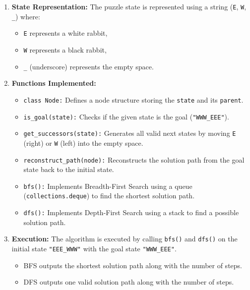 \documentclass[conference]{IEEEtran}
\begin{document}
\begin{enumerate}[label=\alph*)]
  \item \textbf{State Representation:}  
  The puzzle state is represented using a string (\texttt{E}, \texttt{W}, \texttt{\_}) where:  
  \begin{itemize}
    \item \texttt{E} represents a white rabbit,
    \item \texttt{W} represents a black rabbit,
    \item \texttt{\_} (underscore) represents the empty space.
  \end{itemize}

  \vspace{\baselineskip} %

  \item \textbf{Functions Implemented:}
  \begin{itemize}[itemsep=1ex, parsep=0pt]
    \item \texttt{class Node:} Defines a node structure storing the \texttt{state} and its \texttt{parent}.
    \item \texttt{is\_goal(state):} Checks if the given state is the goal (\texttt{"WWW\_EEE"}).
    \item \texttt{get\_successors(state):} Generates all valid next states by moving \texttt{E} (right) or \texttt{W} (left) into the empty space.
    \item \texttt{reconstruct\_path(node):} Reconstructs the solution path from the goal state back to the initial state.
    \item \texttt{bfs():} Implements Breadth-First Search using a queue (\texttt{collections.deque}) to find the shortest solution path.
    \item \texttt{dfs():} Implements Depth-First Search using a stack to find a possible solution path.
  \end{itemize}

  \vspace{\baselineskip}

  \item \textbf{Execution:}  
  The algorithm is executed by calling \texttt{bfs()} and \texttt{dfs()} on the initial state \texttt{"EEE\_WWW"} with the goal state \texttt{"WWW\_EEE"}.  
  \begin{itemize}
    \item BFS outputs the shortest solution path along with the number of steps.
    \item DFS outputs one valid solution path along with the number of steps.
  \end{itemize}
\end{enumerate}
\end{document}
